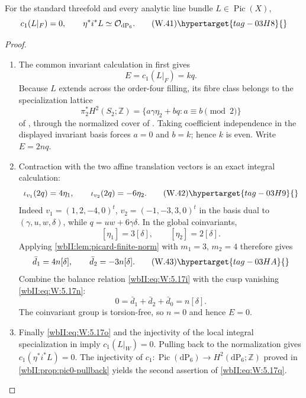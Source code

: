 \begin{proposition}
\hypertarget{tag-03IL}{}\label{wbII:prop:direct-boundary-picard}

For the standard threefold and every analytic line bundle
$L\in\operatorname{Pic}(X)$,
\[
 c_1(L|_F)=0,
 \qquad
 \eta^*i^*L\simeq\mathcal O_{\mathrm{dP}_6}.
\tag{W.41}\hypertarget{tag-03H8}{}\label{wbII:eq:W:5.17q}
\]
\end{proposition}



\begin{proof}

\begin{enumerate}[label=\arabic*.,leftmargin=*]
\item The common invariant calculation in \cite[Proposition~7.26, pp.~61--62]{AC2026} first gives
\[
 E=c_1(L|_F)=kq.
\]
Because $L$ extends across the order-four filling, its fibre class belongs
to the specialization lattice
\[
 \pi_2^*H^2(S_2;\mathbb Z)
 =\{a\gamma\eta_2+bq:a\equiv b\pmod2\}
\]
of \cite[Lemma~A.4, pp.~99--100]{AC2026}, through the normalized cover of .  Taking
coefficient independence in the displayed invariant basis forces
$a=0$ and $b=k$; hence $k$ is even.  Write $E=2nq$.

\item Contraction with the two affine translation vectors is an exact integral
calculation:
\[
 \iota_{v_1}(2q)=4\eta_1,
 \qquad
 \iota_{v_2}(2q)=-6\eta_2.
\tag{W.42}\hypertarget{tag-03H9}{}\label{wbII:eq:W:5.17r}
\]
Indeed $v_1=(1,2,-4,0)^t$, $v_2=(-1,-3,3,0)^t$ in the basis dual to
$(\gamma,u,w,\delta)$, while
$q=uw+6\gamma\delta$.  In the global coinvariants,
\[
 [\eta_1]=3[\delta],\qquad [\eta_2]=2[\delta].
\]
Applying \cref{wbII:lem:picard-finite-norm} with $m_1=3$, $m_2=4$ therefore
gives
\[
 \bar d_1=4n[\delta],\qquad
 \bar d_2=-3n[\delta].
\tag{W.43}\hypertarget{tag-03HA}{}\label{wbII:eq:W:5.17s}
\]
Combine the balance relation \eqref{wbII:eq:W:5.17i} with the cusp vanishing \eqref{wbII:eq:W:5.17n}:
\[
 0=\bar d_1+\bar d_2+\bar d_0=n[\delta].
\]
The coinvariant group is torsion-free, so $n=0$ and hence $E=0$.

\item Finally \eqref{wbII:eq:W:5.17o} and the injectivity of the local integral specialization in
\cite[Theorem~B.1, pp.~101--105]{AC2026} imply
$c_1(L|_W)=0$.  Pulling back to the normalization gives
$c_1(\eta^*i^*L)=0$.  The injectivity of
$c_1:\operatorname{Pic}(\mathrm{dP}_6)\to
H^2(\mathrm{dP}_6;\mathbb Z)$ proved in
\cref{wbII:prop:pic0-pullback} yields the second assertion of \eqref{wbII:eq:W:5.17q}.

\end{enumerate}
\end{proof}
